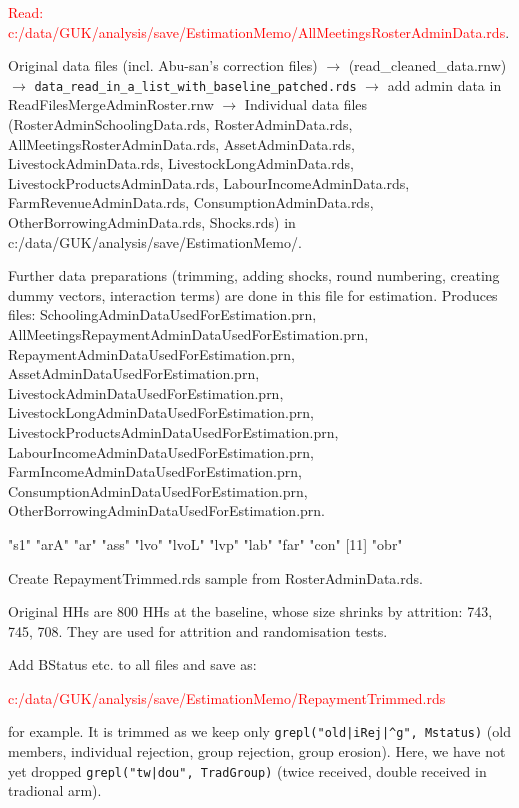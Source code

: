  \textcolor{red}{Read: c:/data/GUK/analysis/save/EstimationMemo/AllMeetingsRosterAdminData.rds}.

Original data files (incl. Abu-san's correction files) $\rightarrow$ (read\_cleaned\_data.rnw) $\rightarrow$  
\verb+data_read_in_a_list_with_baseline_patched.rds+ $\rightarrow$ 
add admin data in ReadFilesMergeAdminRoster.rnw $\rightarrow$ 
Individual data files (RosterAdminSchoolingData.rds, RosterAdminData.rds, AllMeetingsRosterAdminData.rds, AssetAdminData.rds, LivestockAdminData.rds, LivestockLongAdminData.rds, LivestockProductsAdminData.rds, LabourIncomeAdminData.rds, FarmRevenueAdminData.rds, ConsumptionAdminData.rds, OtherBorrowingAdminData.rds, Shocks.rds) in c:/data/GUK/analysis/save/EstimationMemo/.

Further data preparations (trimming, adding shocks, round numbering, creating dummy vectors, interaction terms) are done in this file for estimation. Produces files: \textsf{\footnotesize SchoolingAdminDataUsedForEstimation.prn, AllMeetingsRepaymentAdminDataUsedForEstimation.prn, RepaymentAdminDataUsedForEstimation.prn, AssetAdminDataUsedForEstimation.prn, LivestockAdminDataUsedForEstimation.prn, LivestockLongAdminDataUsedForEstimation.prn, LivestockProductsAdminDataUsedForEstimation.prn, LabourIncomeAdminDataUsedForEstimation.prn, FarmIncomeAdminDataUsedForEstimation.prn, ConsumptionAdminDataUsedForEstimation.prn, OtherBorrowingAdminDataUsedForEstimation.prn}.
\begin{Schunk}
\begin{Soutput}
 [1] "s1"   "arA"  "ar"   "ass"  "lvo"  "lvoL" "lvp"  "lab"  "far"  "con" 
[11] "obr" 
\end{Soutput}
\end{Schunk}


Create \textsf{RepaymentTrimmed.rds} sample from \textsf{RosterAdminData.rds}.


Original HHs are 800 HHs at the baseline, whose size shrinks by attrition: 743, 745, 708. They are used for attrition and randomisation tests. 

Add \textsf{BStatus} etc. to all files and save as: 

\textcolor{red}{c:/data/GUK/analysis/save/EstimationMemo/RepaymentTrimmed.rds}

for example. It is trimmed as we keep only \verb+grepl("old|iRej|^g", Mstatus)+ (old members, individual rejection, group rejection, group erosion). Here, we have not yet dropped \verb+grepl("tw|dou", TradGroup)+ (twice received, double received in tradional arm). 


